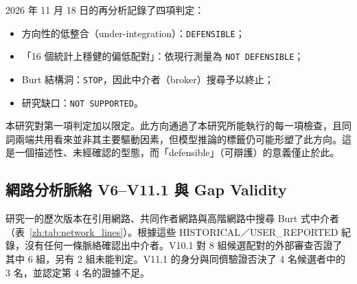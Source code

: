 2026 年 11 月 18 日的再分析記錄了四項判定：
\begin{itemize}
  \item 方向性的低整合（under-integration）：\texttt{DEFENSIBLE}；
  \item 「16 個統計上穩健的偏低配對」：依現行測量為 \texttt{NOT DEFENSIBLE}；
  \item Burt 結構洞：\texttt{STOP}，因此中介者（broker）搜尋予以終止；
  \item 研究缺口：\texttt{NOT SUPPORTED}。
\end{itemize}
本研究對第一項判定加以限定。此方向通過了本研究所能執行的每一項檢查，且同詞兩端共用看來並非其主要驅動因素，但模型推論的標籤仍可能形塑了此方向。這是一個描述性、未經確認的型態，而「defensible」（可辯護）的意義僅止於此。

\subsection{網路分析脈絡 V6--V11.1 與 Gap Validity}
\label{zh:sec:study1_network}

研究一的歷次版本在引用網路、共同作者網路與高階網路中搜尋 Burt 式中介者（表~\ref{zh:tab:network_lines}）。根據這些 HISTORICAL／USER\_REPORTED 紀錄，沒有任何一條脈絡確認出中介者。V10.1 對 8 組候選配對的外部審查否證了其中 6 組，另有 2 組未能判定。V11.1 的身分與同儕驗證否決了 4 名候選者中的 3 名，並認定第 4 名的證據不足。

